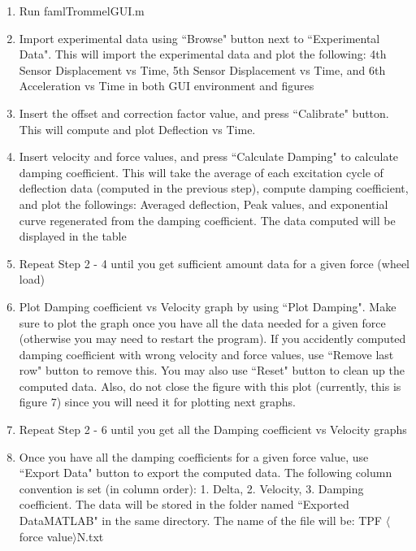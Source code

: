 \documentclass[12pt]{article}
\begin{document}
    \begin{enumerate}

        \item   Run faml\textunderscore Trommel\textunderscore GUI.m

        \item   Import experimental data using ``Browse" button next to ``Experimental Data". This will import
    the experimental data and plot the following: 4th Sensor Displacement vs Time, 5th Sensor Displacement vs
    Time, and 6th Acceleration vs Time in both GUI environment and figures

        \item   Insert the offset and correction factor value, and press ``Calibrate" button. This will compute and plot Deflection vs Time.

        \item   Insert velocity and force values, and press ``Calculate Damping" to
    calculate damping coefficient. This will take the average of each excitation
    cycle of deflection data (computed in the previous step), compute damping
    coefficient, and plot the followings: Averaged deflection, Peak values, and
    exponential curve regenerated from the damping coefficient. The data computed will be displayed in the table

        \item   Repeat Step 2 - 4 until you get sufficient amount data for a given force (wheel load)

        \item   Plot Damping coefficient vs Velocity graph by using ``Plot
    Damping". Make sure to plot the graph once you have all the data needed for a
    given force (otherwise you may need to restart the program). If you accidently
    computed damping coefficient with wrong velocity and force values, use ``Remove
    last row" button to remove this. You may also use ``Reset" button to clean up
    the computed data. Also, do not close the figure with this plot (currently,
    this is figure 7) since you will need it
    for plotting next graphs.

        \item   Repeat Step 2 - 6 until you get all the Damping coefficient vs Velocity graphs

        \item   Once you have all the damping coefficients for a given force value, use ``Export Data"
    button to export the computed data. The following column convention is set (in
    column order): 1. Delta, 2. Velocity, 3. Damping coefficient. The data will be
    stored in the folder named ``Exported Data\textunderscore MATLAB" in the same
    directory. The name of the file will be: TP\textunderscore F\textunderscore
    $\langle$force value$\rangle$N.txt


\end{enumerate}
\end{document}
